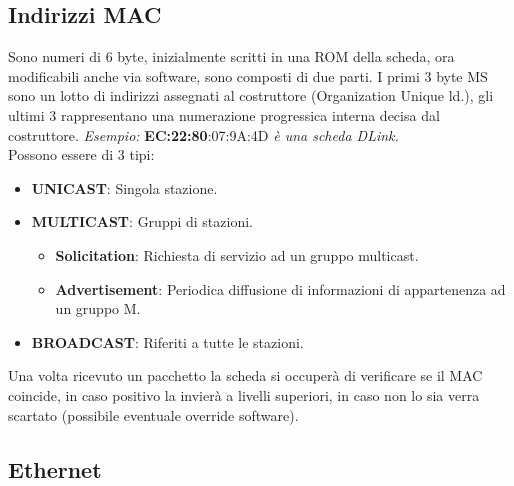 \documentclass[12pt]{article}
\begin{document}
\subsection{Indirizzi MAC}
Sono numeri di 6 byte, inizialmente scritti in una ROM della scheda, ora modificabili anche via software, sono composti di due parti. I primi 3 byte MS sono un lotto di indirizzi assegnati al costruttore (Organization Unique ld.), gli ultimi 3 rappresentano una numerazione progressica interna decisa dal costruttore. \textit{Esempio:} \textbf{EC:22:80}:07:9A:4D \textit{è una scheda DLink.}\\
Possono essere di 3 tipi:
\begin{itemize}
  \item \textbf{UNICAST}: Singola stazione.
  \item \textbf{MULTICAST}: Gruppi di stazioni.
  \begin{itemize}
    \item \textbf{Solicitation}: Richiesta di servizio ad un gruppo multicast.
    \item \textbf{Advertisement}: Periodica diffusione di informazioni di appartenenza ad un gruppo M.
  \end{itemize}
  \item \textbf{BROADCAST}: Riferiti a tutte le stazioni.
\end{itemize}
Una volta ricevuto un pacchetto la scheda si occuperà di verificare se il MAC coincide, in caso positivo la invierà a livelli superiori, in caso non lo sia verra scartato (possibile eventuale override software).

\subsection{Ethernet}
\end{document}
